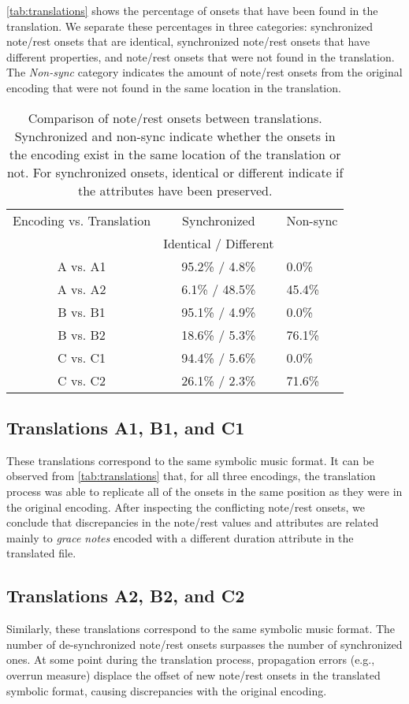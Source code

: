 \autoref{tab:translations} shows the percentage of onsets that have been found in the translation. We separate these percentages in three categories: synchronized note/rest onsets that are identical, synchronized note/rest onsets that have different properties, and note/rest onsets that were not found in the translation. The \emph{Non-sync} category indicates the amount of note/rest onsets from the original encoding that were not found in the same location in the translation.

\begin{table}[h]
  \caption{Comparison of note/rest onsets between translations. Synchronized and non-sync indicate whether the onsets in the encoding exist in the same location of the translation or not. For synchronized onsets, identical or different indicate if the attributes have been preserved.}
  \label{tab:translations}
  \begin{tabular}{ccl}
    \toprule
    Encoding vs. Translation  & Synchronized & Non-sync \\
    & Identical / Different & \\
    \midrule
    A vs. A1 & 95.2\% / 4.8\% & 0.0\% \\
    A vs. A2 & 6.1\% / 48.5\% & 45.4\% \\
    B vs. B1 & 95.1\% / 4.9\% & 0.0\% \\
    B vs. B2 & 18.6\% / 5.3\% & 76.1\% \\
    C vs. C1 & 94.4\% / 5.6\% & 0.0\% \\
    C vs. C2 & 26.1\% / 2.3\% & 71.6\% \\
  \bottomrule
\end{tabular}
\end{table}

\subsection{Translations A1, B1, and C1}
These translations correspond to the same symbolic music format. It can be observed from \autoref{tab:translations} that, for all three encodings, the translation process was able to replicate all of the onsets in the same position as they were in the original encoding. After inspecting the conflicting note/rest onsets, we conclude that discrepancies in the note/rest values and attributes are related mainly to \emph{grace notes} encoded with a different duration attribute in the translated file.

\subsection{Translations A2, B2, and C2}
Similarly, these translations correspond to the same symbolic music format. The number of de-synchronized note/rest onsets surpasses the number of synchronized ones. At some point during the translation process, propagation errors (e.g., overrun measure) displace the offset of new note/rest onsets in the translated symbolic format, causing discrepancies with the original encoding.

